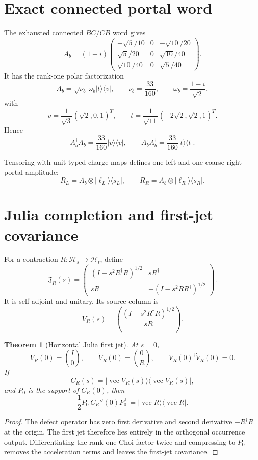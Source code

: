 \documentclass[11pt,oneside,openany]{book}
\numberwithin{equation}{chapter}
\newtheorem{theorem}{Theorem}[chapter]
\theoremstyle{definition}
\theoremstyle{remark}
\newcommand{\vect}{\operatorname{vec}}
\begin{document}
\section{Exact connected portal word}

The exhausted connected \(BC/CB\) word gives
\[
 A_b
 =
 (1-i)
 \begin{pmatrix}
 -\sqrt5/10&0&-\sqrt{10}/20\\
 \sqrt5/20&0&\sqrt{10}/40\\
 \sqrt{10}/40&0&\sqrt5/40
 \end{pmatrix}.
\]
It has the rank-one polar factorization
\[
 \boxed{
 A_b
 =
 \sqrt{\nu_b}\,\omega_b
 |t\rangle\langle v|,
 \qquad
 \nu_b=\frac{33}{160},
 \qquad
 \omega_b=\frac{1-i}{\sqrt2},}
 \label{eq:portal-polar}
\]
with
\[
 v=\frac1{\sqrt3}(\sqrt2,0,1)^T,
 \qquad
 t=\frac1{\sqrt{11}}(-2\sqrt2,\sqrt2,1)^T.
\]
Hence
\[
 A_b^\dagger A_b
 =
 \frac{33}{160}|v\rangle\langle v|,
 \qquad
 A_bA_b^\dagger
 =
 \frac{33}{160}|t\rangle\langle t|.
\]

Tensoring with unit typed charge maps defines one left and one coarse right
portal amplitude:
\[
 R_L=A_b\otimes|\ell_L\rangle\langle s_L|,
 \qquad
 R_R=A_b\otimes|\ell_R\rangle\langle s_R|.
\]

\section{Julia completion and first-jet covariance}

For a contraction \(R:\mathcal H_s\to\mathcal H_t\), define
\[
 \mathfrak J_R(s)
 =
 \begin{pmatrix}
 (I-s^2R^\dagger R)^{1/2}&sR^\dagger\\
 sR&-(I-s^2RR^\dagger)^{1/2}
 \end{pmatrix}.
\]
It is self-adjoint and unitary.  Its source column is
\[
 V_R(s)
 =
 \binom{(I-s^2R^\dagger R)^{1/2}}{sR}.
\]

\begin{theorem}[Horizontal Julia first jet]
\label{thm:horizontal-Julia}
At \(s=0\),
\[
 V_R(0)=\binom I0,
 \qquad
 \dot V_R(0)=\binom0R,
 \qquad
 V_R(0)^\dagger\dot V_R(0)=0.
\]
If
\[
 C_R(s)
 =
 |\vect V_R(s)\rangle\langle\vect V_R(s)|,
\]
and \(P_0\) is the support of \(C_R(0)\), then
\[
 \boxed{
 \frac12P_0^\perp C_R''(0)P_0^\perp
 =
 |\vect R\rangle\langle\vect R|.}
 \label{eq:kernel-Choi-curvature}
\]
\end{theorem}

\begin{proof}
The defect operator has zero first derivative and second derivative
\(-R^\dagger R\) at the origin.  The first jet therefore lies entirely in the
orthogonal occurrence output.  Differentiating the rank-one Choi factor
twice and compressing to \(P_0^\perp\) removes the acceleration terms and
leaves the first-jet covariance.
\end{proof}
\end{document}
